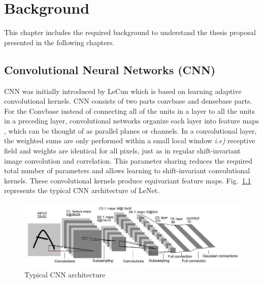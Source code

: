 
\chapter{Background} %

\label{chp:background} %

This chapter includes the required background to understand the thesis proposal presented in the following chapters.

\section{Convolutional Neural Networks (CNN)}

CNN was initially introduced by LeCun \cite{lecun1989handwritten} which is based on learning adaptive convolutional kernels. CNN consists of two parts convbase and densebase parts. For the Convbase instead of connecting all of the units in a layer to all the units in a preceding layer, convolutional networks organize each layer into feature maps \cite{lecun1989handwritten}, which
can be thought of as parallel planes or channels. In a convolutional layer, the weighted sums are only performed within a small local window \textit{i.e)} receptive field and weights are identical for all pixels, just as in regular shift-invariant image convolution and correlation. This parameter sharing reduces the required total number of parameters and allows learning to shift-invariant convolutional kernels. These convolutional kernels produce equivariant feature maps. Fig.~\ref{lenet} represents the typical CNN architecture of LeNet.
\begin{figure}
    \begin{center}
        \includegraphics[width=\textwidth]{Figures/LeNetCNN.jpeg}
        \caption{Typical CNN architecture}
        \label{lenet}
    \end{center}
\end{figure}
